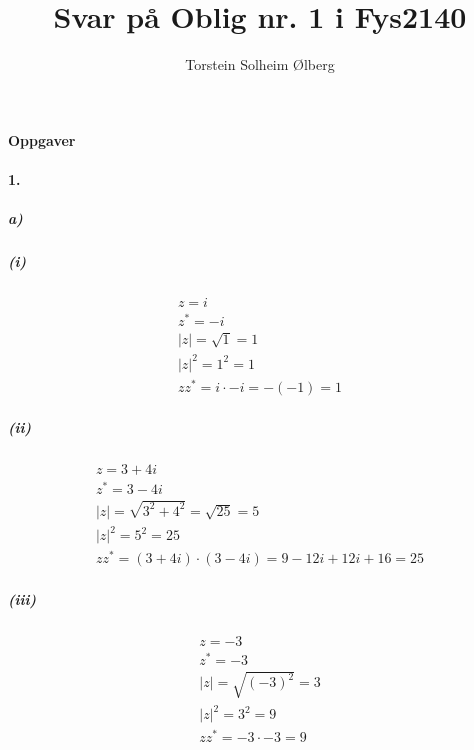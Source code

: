 \documentclass[11pt, A4paper,norsk]{article}
\author{Torstein Solheim Ølberg}
\title{Svar på Oblig nr. 1 i Fys2140}
\begin{document}
\maketitle
	\begin{center}
\Large \textbf{Oppgaver}
	\end{center}









		\paragraph{1.}
			\subparagraph{a)}
				\subparagraph{(i)}
					\begin{gather}
z = i \\
z^{*} = -i \\
|z| = \sqrt{1} = 1 \\
|z|^{2} = 1^{2} = 1 \\
zz^{*} = i \cdot -i = -(-1) = 1
					\end{gather}








				\subparagraph{(ii)}
					\begin{gather}
z = 3 + 4i \\
z^{*} = 3 - 4i \\
|z| = \sqrt{3^{2} + 4^{2}} = \sqrt{25} = 5 \\
|z|^{2} = 5^{2} = 25 \\
zz^{*} = (3 + 4i) \cdot (3 - 4i) = 9 - 12i + 12i + 16 = 25
					\end{gather}









				\subparagraph{(iii)}
					\begin{gather}
z = -3 \\
z^{*} = -3 \\
|z| = \sqrt{(-3)^{2}} = 3 \\
|z|^{2} = 3^{2} = 9 \\
zz^{*} = -3 \cdot -3 = 9
					\end{gather}
\end{document}
